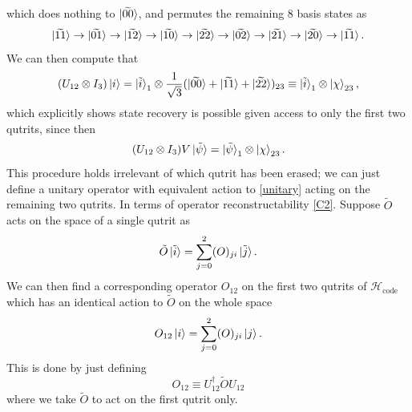 \documentclass[12pt,a4paper]{report}
\numberwithin{equation}{section}
\newcommand{\Hcode}{\mathcal{H}_{\text{code}}}
\theoremstyle{definition}
\theoremstyle{theorem}
\theoremstyle{theorem}
\theoremstyle{example}
\theoremstyle{definition}
\begin{document}
which does nothing to $\ket{\widetilde{00}}$, and permutes the remaining 8 basis states as
\begin{equation}
	\ket{\widetilde{11}}\to\ket{\widetilde{01}}\to\ket{\widetilde{12}}\to\ket{\widetilde{10}}\to\ket{\widetilde{22}}\to\ket{\widetilde{02}}\to\ket{\widetilde{21}}\to\ket{\widetilde{20}}\to\ket{\widetilde{11}}.
\end{equation}
We can then compute that
\begin{equation}
	(U_{12}\otimes I_{3})\ket{i}=\ket{\tilde{i}}_{1}\otimes\frac{1}{\sqrt{3}}(\ket{\widetilde{00}}+\ket{\widetilde{11}}+\ket{\widetilde{22}})_{23}\equiv\ket{\tilde{i}}_{1}\otimes\ket{\chi}_{23},
\end{equation}
which explicitly shows state recovery is possible given access to only the first two qutrits, since then
\begin{equation}\label{staterec}
	(U_{12}\otimes I_{3})V\ket{\tilde{\psi}}=\ket{\tilde{\psi}}_{1}\otimes\ket{\chi}_{23}.
\end{equation}
This procedure holds irrelevant of which qutrit has been erased; we can just define a unitary operator with equivalent action to \ref{unitary} acting on the remaining two qutrits. In terms of operator reconstructability \ref{C2}. Suppose $\tilde{O}$ acts on the space of a single qutrit as
\begin{equation}
	\tilde{O}\ket{\tilde{i}}=\sum_{j=0}^{2}(O)_{ji}\ket{\tilde{j}}.
\end{equation}
We can then find a corresponding operator $O_{12}$ on the first two qutrits of $\Hcode$ which has an identical action to $\tilde{O}$ on the whole space
\begin{equation}
	O_{12}\ket{i}=\sum_{j=0}^{2}(O)_{ji}\ket{j}.
\end{equation}
This is done by just defining
\begin{equation}
	O_{12}\equiv U_{12}^{\dagger}\tilde{O}U_{12}
\end{equation}
where we take $\tilde{O}$ to act on the first qutrit only.
\end{document}
